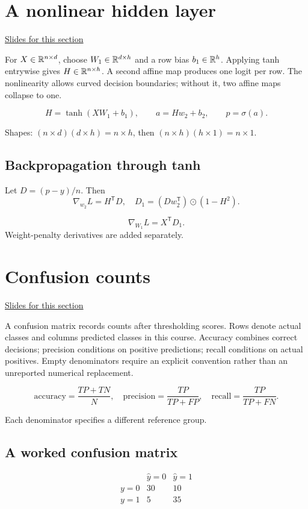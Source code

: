 \documentclass[11pt,letterpaper]{article}
\theoremstyle{definition}\newtheorem{definition}{Definition}\newtheorem{example}{Example}
\numberwithin{equation}{section}
\begin{document}
\section{A nonlinear hidden layer}
\hypertarget{note-a-nonlinear-hidden-layer}{}\label{note:a-nonlinear-hidden-layer}
{\small \href{slides.html\#frame=linear-and-nonlinear-decision-boundaries-figure\&step=1}{Slides for this section}}\par
For $X\in\mathbb{R}^{n\times d}$, choose $W_1\in\mathbb{R}^{d\times h}$ and a row bias $b_1\in\mathbb{R}^h$. Applying tanh entrywise gives $H\in\mathbb{R}^{n\times h}$. A second affine map produces one logit per row. The nonlinearity allows curved decision boundaries; without it, two affine maps collapse to one.

\[
H=\tanh(XW_1+b_1),\qquad a=Hw_2+b_2,\qquad p=\sigma(a).
\]

Shapes: $(n\times d)(d\times h)=n\times h$, then $(n\times h)(h\times1)=n\times1$.

\subsection*{Backpropagation through tanh}
Let $D=(p-y)/n$. Then
\[
\nabla_{w_2}L=H^{\mathsf T}D,
\quad
D_1=(Dw_2^{\mathsf T})\odot(1-H^2).
\]

\[
\nabla_{W_1}L=X^{\mathsf T}D_1.
\]
Weight-penalty derivatives are added separately.
\section{Confusion counts}
\hypertarget{note-confusion-counts}{}\label{note:confusion-counts}
{\small \href{slides.html\#frame=confusion-counts\&step=1}{Slides for this section}}\par
A confusion matrix records counts after thresholding scores. Rows denote actual classes and columns predicted classes in this course. Accuracy combines correct decisions; precision conditions on positive predictions; recall conditions on actual positives. Empty denominators require an explicit convention rather than an unreported numerical replacement.

\[
\mathrm{accuracy}=\frac{TP+TN}{N},\quad
\mathrm{precision}=\frac{TP}{TP+FP},\quad
\mathrm{recall}=\frac{TP}{TP+FN}.
\]

Each denominator specifies a different reference group.

\subsection*{A worked confusion matrix}
\[
\begin{array}{c|cc}&\widehat y=0&\widehat y=1\\\hline y=0&30&10\\y=1&5&35\end{array}
\]
\end{document}
